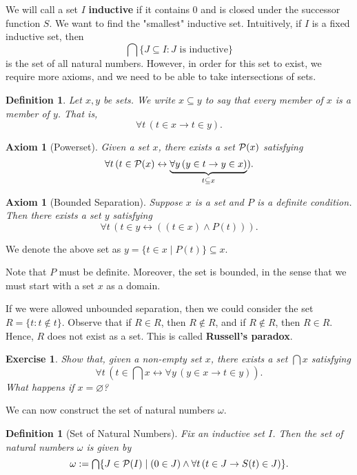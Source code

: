 \documentclass[10pt]{article}
\theoremstyle{newstyle}
\newtheorem{defn}[thm]{Definition}
\newtheorem{axiom}[thm]{Axiom}
\newtheorem{exercise}[thm]{Exercise}
\begin{document}
We will call a set $I$ {\bf inductive} if it contains $0$ and is closed under the successor function $S$. 
We want to find the "smallest" inductive set.
Intuitively, if $I$ is a fixed inductive set, then 
\[ \textstyle\bigcap \{J \subseteq I : J \text{ is inductive}\} \] 
is the set of all natural numbers. However, in order for this set to exist, we require more axioms, and we need to be able to take intersections of sets.

\begin{defn} 
Let $x, y$ be sets. We write $x \subseteq y$ to say that every member of $x$ is a member of $y$. 
That is, 
\[ \forall t \, (t \in x \to t \in y). \] 
\end{defn} 

\begin{axiom}[Powerset] 
Given a set $x$, there exists a set ${\cal P}(x)$ satisfying 
\[ \forall t \, (t \in {\cal P}(x) \leftrightarrow \underbrace{\forall y \, (y \in t \to y \in x)}_{t \subseteq x}). \]
\end{axiom}

\begin{axiom}[Bounded Separation] 
Suppose $x$ is a set and $P$ is a definite condition. Then there exists a set $y$ satisfying 
\[ \forall t \, (t \in y \leftrightarrow ((t \in x) \wedge P(t))). \] 
\end{axiom}
We denote the above set as $y = \{t \in x \mid P(t)\} \subseteq x$. 

Note that $P$ must be definite. Moreover, the set is bounded, in the sense that we must start with 
a set $x$ as a domain. 

If we were allowed unbounded separation, then we could consider the set $R = \{t : t \notin t\}$. 
Observe that if $R \in R$, then $R \notin R$, and if $R \notin R$, then $R \in R$. Hence, 
$R$ does not exist as a set. This is called {\bf Russell's paradox}. 

\begin{exercise} 
Show that, given a non-empty set $x$, there exists 
a set $\bigcap x$ satisfying 
\[ \forall t \, (t \in \textstyle\bigcap x \leftrightarrow \forall y \, (y \in x \to t \in y)). \] 
What happens if $x = \varnothing$?
\end{exercise}

We can now construct the set of natural numbers $\omega$. 

\begin{defn}[Set of Natural Numbers] 
Fix an inductive set $I$. Then the set of natural numbers $\omega$ is given by 
\[ \omega := \textstyle\bigcap \{J \in {\cal P}(I) \mid 
(0 \in J) \wedge \forall t \, (t \in J \to S(t) \in J)\}. \] 
\end{defn}
\end{document}
